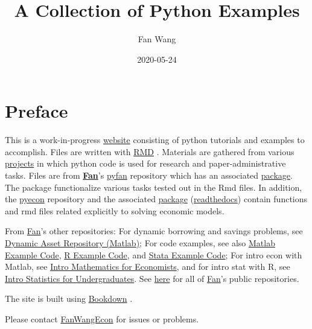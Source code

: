 \documentclass[
]{book}
\title{A Collection of Python Examples}
\author{Fan Wang}
\date{2020-05-24}
\begin{document}
\maketitle

{
\hypersetup{linkcolor=}
\setcounter{tocdepth}{2}
\tableofcontents
}
\hypertarget{preface}{%
\chapter*{Preface}\label{preface}}

This is a work-in-progress \href{https://fanwangecon.github.io/pyfan/}{website} consisting of python tutorials and examples to accomplish. Files are written with \href{https://rmarkdown.rstudio.com/}{RMD} \citep{R-rmarkdown}. Materials are gathered from various \href{https://fanwangecon.github.io/research}{projects} in which python code is used for research and paper-administrative tasks. Files are from \href{https://fanwangecon.github.io/}{\textbf{Fan}}'s \href{https://github.com/FanWangEcon/pyfan}{pyfan} repository which has an associated \href{https://pypi.org/project/pyfan/}{package}. The package functionalize various tasks tested out in the Rmd files. In addition, the \href{https://github.com/FanWangEcon/pyecon}{pyecon} repository and the associated \href{https://pypi.org/project/pyecon/}{package} (\href{https://pyfan.readthedocs.io/en/latest/autoapi/pyfan/index.html\#module-pyfan}{readthedocs}) contain functions and rmd files related explicitly to solving economic models.

From \href{https://fanwangecon.github.io/}{Fan}'s other repositories: For dynamic borrowing and savings problems, see \href{https://fanwangecon.github.io/CodeDynaAsset/}{Dynamic Asset Repository (Matlab)}; For code examples, see also \href{https://fanwangecon.github.io/M4Econ/}{Matlab Example Code}, \href{https://fanwangecon.github.io/R4Econ/}{R Example Code}, and \href{https://fanwangecon.github.io/Stata4Econ/}{Stata Example Code}; For intro econ with Matlab, see \href{https://fanwangecon.github.io/Math4Econ/}{Intro Mathematics for Economists}, and for intro stat with R, see \href{https://fanwangecon.github.io/Stat4Econ/}{Intro Statistics for Undergraduates}. See \href{https://github.com/FanWangEcon}{here} for all of \href{https://fanwangecon.github.io/}{Fan}'s public repositories.

The site is built using \href{https://bookdown.org/}{Bookdown} \citep{R-bookdown}.

Please contact \href{https://fanwangecon.github.io/}{FanWangEcon} for issues or problems.
\end{document}
